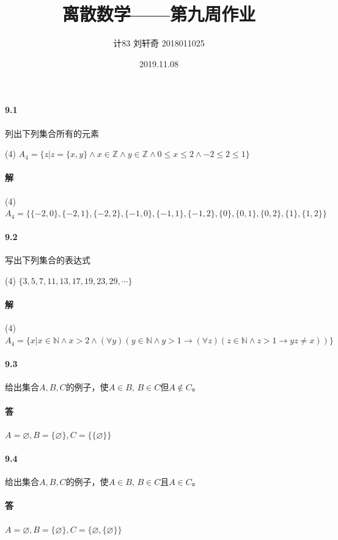 \documentclass[UTF8]{ctexart}
\title{离散数学——第九周作业}
\author{计83  刘轩奇  2018011025}
\date{2019.11.08}
\newcommand{\snatural}{\mathbb{N}}
\newcommand{\sinteger}{\mathbb{Z}}
\begin{document}
\maketitle

\paragraph{9.1}\label{9.1}
列出下列集合所有的元素

(4) $A_4 = \{ z|z= \{ x,y \} \land x \in \sinteger \land y \in \sinteger \land 0 \le x \le 2 \land -2 \le 2 \le 1 \} $

\paragraph{解}
(4) $A_4 = \{ \{ -2,0 \} , \{ -2,1 \} , \{ -2,2 \} , \{ -1,0 \} , \{ -1,1 \} , \{ -1,2 \} , \{ 0 \} , \{ 0,1 \} , \{ 0,2 \} , \{ 1 \} , \{ 1,2 \} \} $

\paragraph{9.2}\label{9.2}
写出下列集合的表达式

(4) $\{3,5,7,11,13,17,19,23,29,\cdots\}$

\paragraph{解}
(4) $A_4 = \{ x|x \in \snatural \land x>2 \land ( \forall y)(y \in \snatural \land y>1 \rightarrow ( \forall z)(z \in \snatural \land z>1 \rightarrow yz \neq x)) \} $

\paragraph{9.3}\label{9.3}
给出集合$A,B,C$的例子，使$A \in B$, $B \in C$但$A \notin C$。

\paragraph{答}
$A = \varnothing, B = \{ \varnothing \} , C = \{ \{ \varnothing \} \} $

\paragraph{9.4}\label{9.4}
给出集合$A,B,C$的例子，使$A \in B$, $B \in C$且$A \in C$。

\paragraph{答}
$A = \varnothing, B = \{ \varnothing \} , C = \{ \varnothing, \{ \varnothing \} \} $
\end{document}
